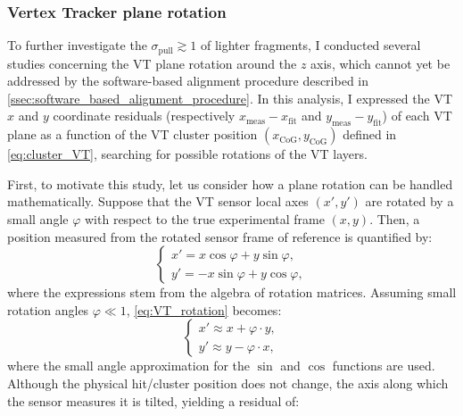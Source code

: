 \subsubsection{Vertex Tracker plane rotation}\label{sssec:vt_plane_rotation}
To further investigate the $\sigma_\text{pull}\gtrsim1$ of lighter fragments, I conducted several studies concerning the VT plane rotation around the $z$ axis, which cannot yet be addressed by the software-based alignment procedure described in \autoref{ssec:software_based_alignment_procedure}. In this analysis, I expressed the VT $x$ and $y$ coordinate residuals (respectively $x_{\text{meas}}-x_{\text{fit}}$ and $y_{\text{meas}}-y_{\text{fit}}$) of each VT plane as a function of the VT cluster position $(x_{\mathrm{CoG}},y_{\mathrm{CoG}})$ defined in \autoref{eq:cluster_VT}, searching for possible rotations of the VT layers.

First, to motivate this study, let us consider how a plane rotation can be handled mathematically. Suppose that the VT sensor local axes $(x',y')$ are rotated by a small angle $\varphi$ with respect to the true experimental frame $(x,y)$. Then, a position measured from the rotated sensor frame of reference is quantified by:
\begin{equation}
	\begin{cases}
		x' = x\cos\varphi + y\sin\varphi, \\
		y' = -x\sin\varphi + y\cos\varphi,
	\end{cases}
	\label{eq:VT_rotation}
\end{equation}
where the expressions stem from the algebra of rotation matrices. Assuming small rotation angles $\varphi\ll1$, \autoref{eq:VT_rotation} becomes:
\begin{equation}
	\begin{cases}
		x' \approx x+\varphi\cdot y, \\
		y' \approx y- \varphi\cdot x,
	\end{cases}
	\label{eq:VT_rotation_small_angles}
\end{equation}
where the small angle approximation for the $\sin$ and $\cos$ functions are used. Although the physical hit/cluster position does not change, the axis along which the sensor measures it is tilted, yielding a residual of:


